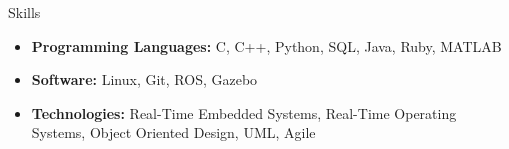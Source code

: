 \documentclass[]{../mcdowellcv}
\begin{document}
\begin{cvsection}{Skills}

    \begin{cvsubsection}{}{}{}
        \begin{itemize}
            \item \textbf{Programming Languages:} C, C++, Python, SQL, Java, Ruby, MATLAB
            \item \textbf{Software:} Linux, Git, ROS, Gazebo
            \item \textbf{Technologies:} Real-Time Embedded Systems, Real-Time Operating Systems, Object Oriented Design, UML, Agile
        \end{itemize}
    \end{cvsubsection}

\end{cvsection}
\end{document}
